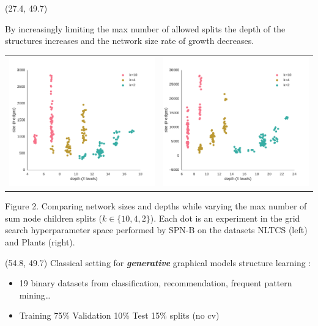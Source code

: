 \documentclass[final]{beamer}
\begin{document}
\begin{frame}{}
  \begin{textblock}{25.2}(27.4, 49.7)

    \footnotesize
    By increasingly limiting the max number of allowed splits the depth of the
    structures increases and the network size rate of growth
    decreases.  
    \begin{table}[ht]
      \setlength{\tabcolsep}{30pt}  
      \centering
      \begin{tabular}{c c}
        \includegraphics[width=0.4\linewidth]{figures/nltcs-depth.pdf}&\includegraphics[width=0.4\linewidth]{figures/plants-depth.pdf}
      \end{tabular}
    \end{table}
    \vspace{-20pt}
    \begin{center}
      \begin{minipage}[t]{0.9\linewidth}
        \tiny\flushleft
        Figure 2. Comparing network sizes and depths while varying the max
        number of sum node children splits ($k\in\{10, 4, 2\}$). Each dot is an experiment
        in the grid search hyperparameter space performed by
        \textsf{SPN-B} on the datasets NLTCS (left) and
        Plants (right).
      \end{minipage}
    \end{center}

    
  \end{textblock}
  
  \begin{textblock}{25.2}(54.8, 49.7)
    \footnotesize
    Classical setting for \emph{\textbf{generative}} graphical models
    structure learning \parencite{Gens2013}:
    \setlength{\leftmargini}{30pt}
    \begin{itemize}
      \itemsep 7pt
    \item 19 binary datasets from classification, recommendation,
      frequent pattern mining\dots \parencite{Haaren2012}
    \item Training 75\% Validation 10\% Test 15\%  splits (no cv)
    \end{itemize}\bigskip


\end{textblock}
\end{frame}
\end{document}

